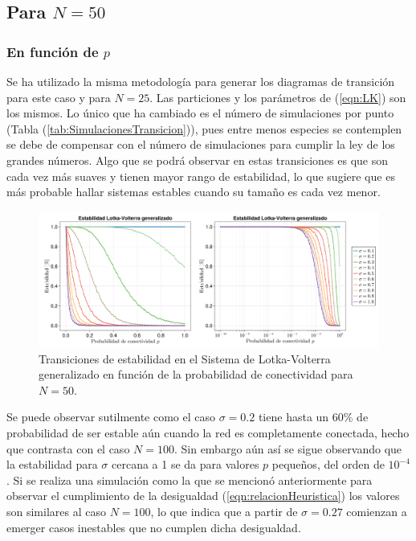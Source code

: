 \subsection{Para $N=50$}

\subsubsection*{En función de $p$}

Se ha utilizado la misma metodología para generar los diagramas de transición para este caso y para $N=25$. Las particiones y los parámetros de (\ref{eqn:LK}) son los mismos. Lo único que ha cambiado es el número de simulaciones por punto (Tabla (\ref{tab:SimulacionesTransicion})), pues entre menos especies se contemplen se debe de compensar con el número de simulaciones para cumplir la ley de los grandes números. Algo que se podrá observar en estas transiciones es que son cada vez más suaves y tienen mayor rango de estabilidad, lo que sugiere que es más probable hallar sistemas estables cuando su tamaño es cada vez menor.
\begin{figure}[h!]
	\centering
	\includegraphics[scale=0.16]{../Imagenes/EstabilidadLKp50}
	\caption{Transiciones de estabilidad en el Sistema de Lotka-Volterra generalizado en función de la probabilidad de conectividad para $N=50$.}
	\label{fig:EstabilidadLKp50}
\end{figure}

Se puede observar sutilmente como el caso $\sigma=0.2$ tiene hasta un 60\% de probabilidad de ser estable aún cuando la red es completamente conectada, hecho que contrasta con el caso $N=100$. Sin embargo aún así se sigue observando  que la estabilidad para $\sigma$ cercana a 1 se da para valores $p$ pequeños, del orden de $10^{-4}$. Si se realiza una simulación como la que se mencionó anteriormente para observar el cumplimiento de la desigualdad (\ref{eqn:relacionHeuristica}) los valores son similares al caso $N=100$, lo que indica que a partir de $\sigma=0.27$ comienzan a emerger casos inestables que no cumplen dicha desigualdad.


